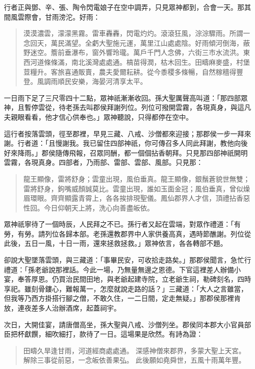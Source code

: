 行者正與鄧、辛、張、陶令閃電娘子在空中調弄，只見眾神都到，合會一天。那其間風雲際會，甘雨滂沱。好雨：
\begin{quote}
漠漠濃雲，濛濛黑霧。雷車轟轟，閃電灼灼。滾滾狂風，淙淙驟雨。所謂一念回天，萬民滿望。全虧大聖施元運，萬里江山處處陰。好雨傾河倒海，蔽野迷空。簷前垂瀑布，窗外響玲瓏。萬戶千門人念佛，六街三市水流洪。東西河道條條滿，南北溪灣處處通。槁苗得潤，枯木回生。田疇麻麥盛，村堡荳糧升。客旅喜通販賣，農夫愛爾耘耕。從今黍稷多條暢，自然稼穡得豐登。風調雨順民安樂，海晏河清享太平。
\end{quote}

一日雨下足了三尺零四十二點，眾神祇漸漸收回。孫大聖厲聲高叫道：「那四部眾神，且暫停雲從，待老孫去叫郡侯拜謝列位。列位可撥開雲霧，各現真身，與這凡夫親眼看看，他才信心供奉也。」眾神聽說，只得都停在空中。

這行者按落雲頭，徑至郡裡，早見三藏、八戒、沙僧都來迎接；那郡侯一步一拜來謝。行者道：「且慢謝我。我已留住四部神祇，你可傳召多人同此拜謝，教他向後好來降雨。」郡侯隨傳飛報，召眾同酬，都一個個拈香朝拜。只見那四部神祇開明雲霧，各現真身。四部者，乃雨部、雷部、雲部、風部。只見那：
\begin{quote}
龍王顯像，雷將舒身；雲童出現，風伯垂真。龍王顯像，銀鬚蒼貌世無雙；雷將舒身，鉤嘴威顏誠莫比。雲童出現，誰如玉面金冠；風伯垂真，曾似燥眉環眼。齊齊顯露青霄上，各各挨排現聖儀。鳳仙郡界人才信，頂禮拈香惡性回。今日仰朝天上將，洗心向善盡皈依。
\end{quote}

眾神祇寧待了一個時辰，人民拜之不已。孫行者又起在雲端，對眾作禮道：「有勞，有勞。請列位各歸本部。老孫還教郡界中人家供養高真，遇時節醮謝。列位從此後，五日一風，十日一雨，還來拯救拯救。」眾神依言，各各轉部不題。

卻說大聖墜落雲頭，與三藏道：「事畢民安，可收拾走路矣。」那郡侯聞言，急忙行禮道：「孫老爺說那裡話。今此一場，乃無量無邊之恩德。下官這裡差人辦備小宴，奉答厚恩。仍買治民間田地，與老爺起建寺院，立老爺生祠，勒碑刻名，四時享祀。雖刻骨鏤心，難報萬一，怎麼就說走路的話？」三藏道：「大人之言雖當，但我等乃西方掛搭行腳之僧，不敢久住，一二日間，定走無疑。」那郡侯那裡肯放，連夜差多人治辦酒席，起蓋祠宇。

次日，大開佳宴，請唐僧高坐，孫大聖與八戒、沙僧列坐。郡侯同本郡大小官員部臣把杯獻饌，細吹細打，款待了一日。這場果是欣然。有詩為證：
\begin{quote}
田疇久旱逢甘雨，河道經商處處通。
深感神僧來郡界，多蒙大聖上天宮。
解除三事從前惡，一念皈依善果弘。
此後願如堯舜世，五風十雨萬年豐。
\end{quote}

